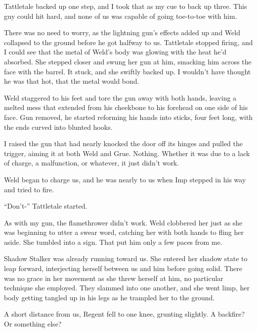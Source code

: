 Tattletale backed up one step, and I took that as my cue to back up three. This guy could hit hard, and none of us was capable of going toe-to-toe with him.



There was no need to worry, as the lightning gun's effects added up and Weld collapsed to the ground before he got halfway to us.  Tattletale stopped firing, and I could see that the metal of Weld's body was glowing with the heat he'd absorbed.  She stepped closer and swung her gun at him, smacking him across the face with the barrel.  It stuck, and she swiftly backed up.  I wouldn't have thought he was that hot, that the metal would bond.



Weld staggered to his feet and tore the gun away with both hands, leaving a melted mess that extended from his cheekbone to his forehead on one side of his face.  Gun removed, he started reforming his hands into sticks, four feet long, with the ends curved into blunted hooks.



I raised the gun that had nearly knocked the door off its hinges and pulled the trigger, aiming it at both Weld and Grue.  Nothing.  Whether it was due to a lack of charge, a malfunction, or whatever, it just didn't work.



Weld began to charge us, and he was nearly to us when Imp stepped in his way and tried to fire.



``Don't-'' Tattletale started.



As with my gun, the flamethrower didn't work.  Weld clobbered her just as she was beginning to utter a swear word, catching her with both hands to fling her aside.  She tumbled into a sign.  That put him only a few paces from me.



Shadow Stalker was already running toward us.  She entered her shadow state to leap forward, interjecting herself between us and him before going solid.  There was no grace in her movement as she threw herself at him, no particular technique she employed.  They slammed into one another, and she went limp, her body getting tangled up in his legs as he trampled her to the ground.



A short distance from us, Regent fell to one knee, grunting slightly.  A backfire?  Or something else?



